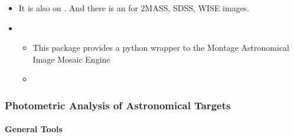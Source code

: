 \documentclass[letterpaper,10pt,english]{sphinxmanual}
\begin{document}
\begin{itemize}
\begin{itemize}
\item {} 
It is also on
. And there is
an  for 2MASS,
SDSS, WISE images.

\item {} 
\begin{itemize}
\item {} 
This package provides a python wrapper to the Montage
Astronomical Image Mosaic Engine

\item {} 

\end{itemize}

\end{itemize}

\end{itemize}


\subsubsection{Photometric Analysis of Astronomical Targets}
\label{\detokenize{resource/astro/topics/photometry:photometric-analysis-of-astronomical-targets}}\label{\detokenize{resource/astro/topics/photometry::doc}}

\paragraph{General Tools}
\label{\detokenize{resource/astro/topics/photometry:general-tools}}
\end{document}
